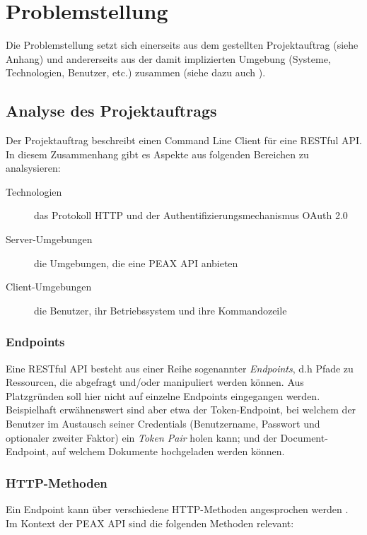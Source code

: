 \section{Problemstellung}

Die Problemstellung setzt sich einerseits aus dem gestellten Projektauftrag (siehe Anhang) und andererseits aus der damit implizierten Umgebung (Systeme, Technologien, Benutzer, etc.) zusammen (siehe dazu auch ).

\subsection{Analyse des Projektauftrags}

Der Projektauftrag beschreibt einen Command Line Client für eine RESTful API. In diesem Zusammenhang gibt es Aspekte aus folgenden Bereichen zu analsysieren:

\begin{description}
    \item[Technologien] das Protokoll HTTP und der Authentifizierungsmechanismus OAuth 2.0
    \item[Server-Umgebungen] die Umgebungen, die eine PEAX API anbieten
    \item[Client-Umgebungen] die Benutzer, ihr Betriebssystem und ihre Kommandozeile
\end{description}

\subsubsection{Endpoints}

Eine RESTful API besteht aus einer Reihe sogenannter \textit{Endpoints}, d.h Pfade zu Ressourcen, die abgefragt und/oder manipuliert werden können. Aus Platzgründen soll hier nicht auf einzelne Endpoints eingegangen werden. Beispielhaft erwähnenswert sind aber etwa der Token-Endpoint, bei welchem der Benutzer im Austausch seiner Credentials (Benutzername, Passwort und optionaler zweiter Faktor) ein \textit{Token Pair} holen kann; und der Document-Endpoint, auf welchem Dokumente hochgeladen werden können.

\subsubsection{HTTP-Methoden}

Ein Endpoint kann über verschiedene HTTP-Methoden angesprochen werden \cite[Abschnitt 4.3]{RFC7231}. Im Kontext der PEAX API sind die folgenden Methoden relevant:

